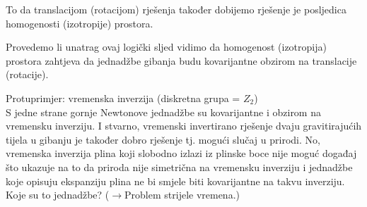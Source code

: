 To da translacijom (rotacijom) rješenja također dobijemo rješenje je posljedica
homogenosti (izotropije) prostora.

Provedemo li unatrag ovaj logički sljed vidimo da homogenost
(izotropija) prostora zahtjeva da jednadžbe gibanja budu kovarijantne
obzirom na translacije (rotacije).


Protuprimjer: vremenska inverzija (diskretna grupa = $Z_2$) \\
  S jedne strane gornje Newtonove jednadžbe su kovarijantne i obzirom na vremensku
inverziju. I stvarno, vremenski invertirano rješenje dvaju gravitirajućih
tijela u gibanju je također dobro rješenje tj. mogući slučaj u prirodi.
No, vremenska inverzija plina koji slobodno izlazi iz plinske boce nije
moguć događaj što ukazuje na to da priroda nije simetrična na vremensku inverziju i
jednadžbe koje opisuju ekspanziju plina ne bi smjele biti kovarijantne
na takvu inverziju. Koje su to jednadžbe? ($\to$Problem strijele vremena.)


